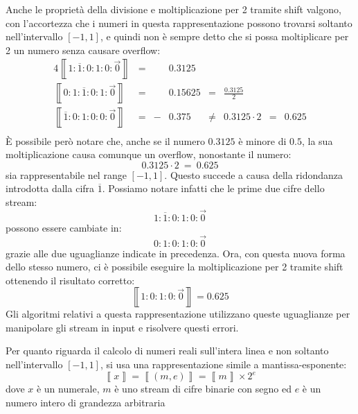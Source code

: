 \documentclass[Lau,oneside]{sapthesis}
\begin{document}
Anche le proprietà della divisione e moltiplicazione per 2 tramite shift valgono, con l'accortezza che i numeri in questa rappresentazione possono trovarsi soltanto nell'intervallo $\left[-1,1\right]$, e quindi non è sempre detto che si possa moltiplicare per 2 un numero senza causare overflow:
\begin{alignat*}{4}
\left\llbracket1:\overline{1}:0:1:0:\overrightarrow{0}\right\rrbracket &{}={}& &0.3125\\
\left\llbracket0:1:\overline{1}:0:1:\overrightarrow{0}\right\rrbracket &{}={}& &0.15625 &{}={}& \frac{0.3125}{2}\\
\left\llbracket\overline{1}:0:1:0:0:\overrightarrow{0}\right\rrbracket &{}={}& -&0.375 &{}\neq{}& 0.3125 \cdot 2 &{}={}& 0.625\\
\end{alignat*}
È possibile però notare che, anche se il numero $0.3125$ è minore di $0.5$, la sua moltiplicazione causa comunque un overflow, nonostante il numero:
$$0.3125 \cdot 2\ =\ 0.625$$
sia rappresentabile nel range $\left[-1,1\right]$. Questo succede a causa della ridondanza introdotta dalla cifra $\overline{1}$. Possiamo notare infatti che le prime due cifre dello stream:
$$1:\overline{1}:0:1:0:\overrightarrow{0}$$
possono essere cambiate in:
$$0:1:0:1:0:\overrightarrow{0}$$
grazie alle due uguaglianze indicate in precedenza. Ora, con questa nuova forma dello stesso numero, ci è possibile eseguire la moltiplicazione per 2 tramite shift ottenendo il risultato corretto:
$$\left\llbracket1:0:1:0:\overrightarrow{0}\right\rrbracket = 0.625$$
Gli algoritmi relativi a questa rappresentazione utilizzano queste uguaglianze per manipolare gli stream in input e risolvere questi errori.

Per quanto riguarda il calcolo di numeri reali sull'intera linea e non soltanto nell'intervallo $\left[-1,1\right]$, si usa una rappresentazione simile a mantissa-esponente:
$$\left\llbracket x \right\rrbracket = \left\llbracket (m, e) \right\rrbracket = \left\llbracket m \right\rrbracket \times 2^e$$
dove $x$ è un numerale, $m$ è uno stream di cifre binarie con segno ed $e$ è un numero intero di grandezza arbitraria
\end{document}
